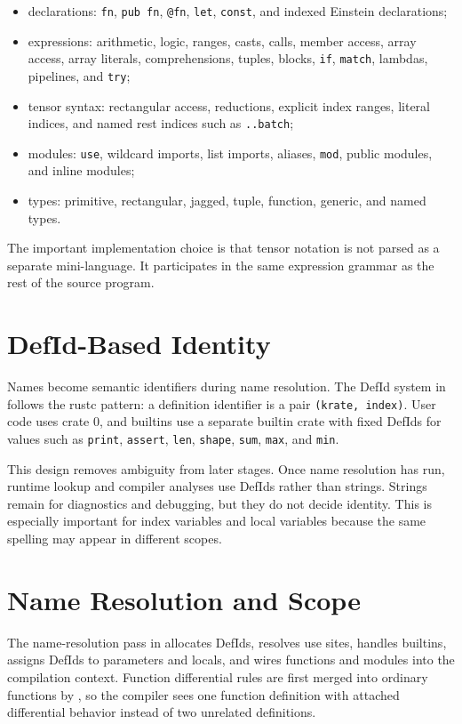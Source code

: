 \begin{itemize}
\item declarations: \texttt{fn}, \texttt{pub fn}, \texttt{@fn},
\texttt{let}, \texttt{const}, and indexed Einstein declarations;
\item expressions: arithmetic, logic, ranges, casts, calls, member access,
array access, array literals, comprehensions, tuples, blocks, \texttt{if},
\texttt{match}, lambdas, pipelines, and \texttt{try};
\item tensor syntax: rectangular access, reductions, explicit index ranges,
literal indices, and named rest indices such as \texttt{..batch};
\item modules: \texttt{use}, wildcard imports, list imports, aliases,
\texttt{mod}, public modules, and inline modules;
\item types: primitive, rectangular, jagged, tuple, function, generic, and
named types.
\end{itemize}

The important implementation choice is that tensor notation is not parsed as a
separate mini-language. It participates in the same expression grammar as the
rest of the source program.

\section{DefId-Based Identity}

Names become semantic identifiers during name resolution. The DefId system in
 follows the rustc pattern: a definition
identifier is a pair \texttt{(krate, index)}. User code uses crate 0, and
builtins use a separate builtin crate with fixed DefIds for values such as
\texttt{print}, \texttt{assert}, \texttt{len}, \texttt{shape}, \texttt{sum},
\texttt{max}, and \texttt{min}.

This design removes ambiguity from later stages. Once name resolution has run,
runtime lookup and compiler analyses use DefIds rather than strings. Strings
remain for diagnostics and debugging, but they do not decide identity. This is
especially important for index variables and local variables because the same
spelling may appear in different scopes.

\section{Name Resolution and Scope}

The name-resolution pass in 
allocates DefIds, resolves use sites, handles builtins, assigns DefIds to
parameters and locals, and wires functions and modules into the compilation
context. Function differential rules are first merged into ordinary functions by
, so the compiler sees one
function definition with attached differential behavior instead of two
unrelated definitions.

